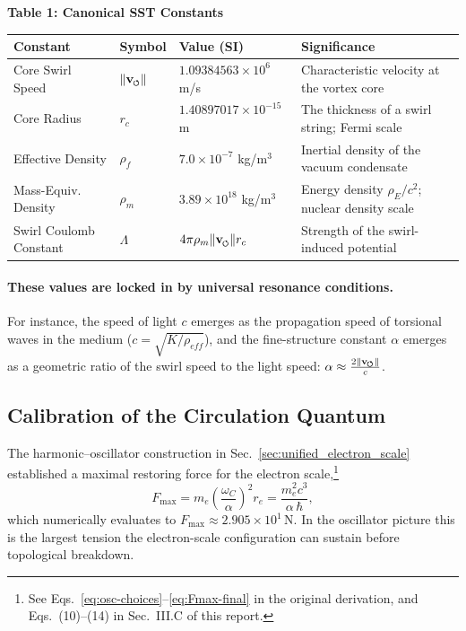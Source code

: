 \documentclass[11pt]{article}
\newcommand{\vswirl}{\mathbf{v}_{\mkern-2mu\scriptscriptstyle\boldsymbol{\circlearrowleft}}}
\begin{document}
\textbf{Table 1: Canonical SST Constants}

\begin{table}[h]
    \centering
    \begin{tabular}{llll}
        \toprule
        \textbf{Constant} & \textbf{Symbol} & \textbf{Value (SI)} & \textbf{Significance} \\
        \midrule
        Core Swirl Speed & $\|\vswirl\|$ & $1.09384563 \times 10^6$ m/s & Characteristic velocity at the vortex core \\
        Core Radius & $r_c$ & $1.40897017 \times 10^{-15}$ m & The thickness of a swirl string; Fermi scale \\
        Effective Density & $\rho_f$ & $7.0 \times 10^{-7}$ kg/m$^3$ & Inertial density of the vacuum condensate \\
        Mass-Equiv. Density & $\rho_m$ & $3.89 \times 10^{18}$ kg/m$^3$ & Energy density $\rho_E/c^2$; nuclear density scale \\
        Swirl Coulomb Constant & $\Lambda$ & $4\pi \rho_m \|{\vswirl}\| r_c $ & Strength of the swirl-induced potential \\
        \bottomrule
    \end{tabular}
    \label{tab:canonical_constants}
\end{table}
            \paragraph{These values are locked in by universal resonance conditions.} For instance, the speed of light $c$ emerges as the propagation speed of torsional waves in the medium ($c = \sqrt{K/\rho_{eff}}$), and the fine-structure constant $\alpha$ emerges as a geometric ratio of the swirl speed to the light speed: $\alpha \approx \frac{2 \|\vswirl\|} { c}$.

    \subsection{Calibration of the Circulation Quantum}
        \label{sec:Gamma0_calibration}

The harmonic–oscillator construction in Sec.~\ref{sec:unified_electron_scale} established a maximal restoring force for the electron scale,\footnote{See Eqs.~\eqref{eq:osc-choices}--\eqref{eq:Fmax-final} in the original derivation, and Eqs.~(10)–(14) in Sec.~III.C of this report.}
        \begin{equation}
    F_{\max} = m_e\left(\frac{\omega_C}{\alpha}\right)^2 r_e = \frac{m_e^2 c^3}{\alpha\,\hbar},
            \label{eq:Fmax_EM_again}
        \end{equation}
which numerically evaluates to \(F_{\max} \approx 2.905\times 10^{1}\,\mathrm{N}\). In the oscillator picture this is the largest tension the electron-scale configuration can sustain before topological breakdown.
\end{document}
